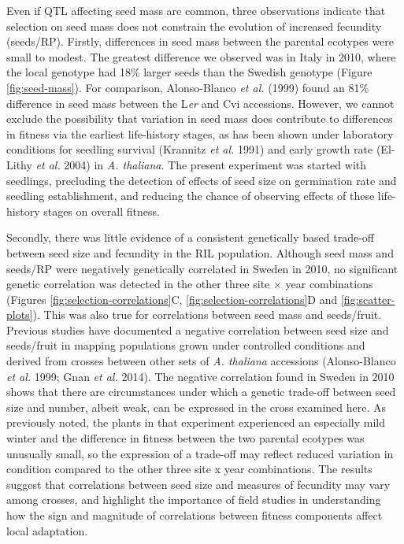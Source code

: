 \documentclass[]{article}
\begin{document}
Even if QTL affecting seed mass are common, three observations indicate that selection on seed mass does not constrain the evolution of increased fecundity (seeds/RP). Firstly, differences in seed mass between the parental ecotypes were small to modest. The greatest difference we observed was in Italy in 2010, where the local genotype had 18\% larger seeds than the Swedish genotype (Figure \ref{fig:seed-mass}). For comparison, Alonso-Blanco \emph{et al.} (1999) found an 81\% difference in seed mass between the L\emph{er} and Cvi accessions. However, we cannot exclude the possibility that variation in seed mass does contribute to differences in fitness via the earliest life-history stages, as has been shown under laboratory conditions for seedling survival (Krannitz \emph{et al.} 1991) and early growth rate (El-Lithy \emph{et al.} 2004) in \emph{A. thaliana}. The present experiment was started with seedlings, precluding the detection of effects of seed size on germination rate and seedling establishment, and reducing the chance of observing effects of these life-history stages on overall fitness.

Secondly, there was little evidence of a consistent genetically based trade-off between seed size and fecundity in the RIL population. Although seed mass and seeds/RP were negatively genetically correlated in Sweden in 2010, no significant genetic correlation was detected in the other three site × year combinations (Figures \ref{fig:selection-correlations}C, \ref{fig:selection-correlations}D and \ref{fig:scatter-plots}). This was also true for correlations between seed mass and seeds/fruit. Previous studies have documented a negative correlation between seed size and seeds/fruit in mapping populations grown under controlled conditions and derived from crosses between other sets of \emph{A. thaliana} accessions (Alonso-Blanco \emph{et al.} 1999; Gnan \emph{et al.} 2014). The negative correlation found in Sweden in 2010 shows that there are circumstances under which a genetic trade-off between seed size and number, albeit weak, can be expressed in the cross examined here. As previously noted, the plants in that experiment experienced an especially mild winter and the difference in fitness between the two parental ecotypes was unusually small, so the expression of a trade-off may reflect reduced variation in condition compared to the other three site x year combinations. The results suggest that correlations between seed size and measures of fecundity may vary among crosses, and highlight the importance of field studies in understanding how the sign and magnitude of correlations between fitness components affect local adaptation.
\end{document}
